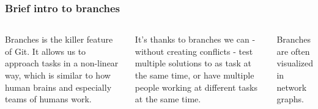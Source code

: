 \documentclass[aspectratio=169]{beamer} %
\begin{document}
\begin{frame}
	\frametitle{Brief intro to branches}
	\begin{columns}[c]
		
		
		Branches is the killer feature of Git. 
		It allows us to approach tasks in a non-linear way,
		which is similar to how human brains
		and especially teams of humans work.
		\vspace{1.5em}	

		It's thanks to branches we can - without creating conflicts -
		test multiple solutions to as task at the same time, or 
		have multiple people working at different tasks at the same time.
		\vspace{1.5em}
			
		Branches are often visualized in network graphs.
		
		

\end{columns}
\end{frame}
\end{document}
